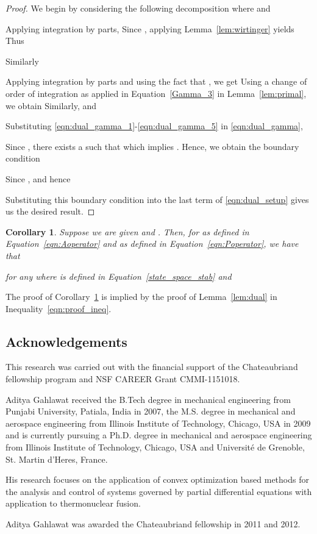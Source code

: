 \documentclass[9pt,journal,twocolumn]{IEEEtran}
\newtheorem{corollary}{Corollary}
\begin{document}
\begin{proof}
We begin by considering the following decomposition
 where
 and


Applying integration by parts,
 Since , applying Lemma~\ref{lem:wirtinger} yields
 Thus


Similarly


Applying integration by parts and using the fact that , we get
 Using a change of order of integration as applied in Equation~\eqref{Gamma_3} in Lemma~\ref{lem:primal}, we obtain
 Similarly,
 and


Substituting \eqref{eqn:dual_gamma_1}-\eqref{eqn:dual_gamma_5} in \eqref{eqn:dual_gamma},


Since , there exists a  such that  which implies . Hence, we obtain the boundary condition

Since ,  and hence

Substituting this boundary condition into the last term of \eqref{eqn:dual_setup} gives us the desired result.
\end{proof}


\begin{corollary}\label{cor:dual2}
Suppose we are given   and . Then, for  as defined in Equation~\eqref{eqn:Aoperator} and  as defined in Equation~\eqref{eqn:Poperator}, we have that

for any  where  is defined in Equation~\eqref{state_space_stab} and

\end{corollary}
The proof of Corollary~\ref{cor:dual2} is implied by the proof of Lemma~\ref{lem:dual} in Inequality~\eqref{eqn:proof_ineq}.


\subsection{Acknowledgements}

 This research was carried out with the financial support of the Chateaubriand fellowship program and NSF CAREER Grant CMMI-1151018.
 


\begin{IEEEbiographynophoto}{Aditya Gahlawat}
received the B.Tech degree in mechanical engineering from Punjabi University, Patiala, India in 2007, the M.S. degree in mechanical and aerospace engineering from Illinois Institute of Technology, Chicago, USA in 2009 and is currently pursuing a Ph.D. degree in mechanical and aerospace engineering from Illinois Institute of Technology, Chicago, USA and Universit\'{e} de Grenoble, St. Martin d'Heres, France. 

His research focuses on the application of convex optimization based methods for the analysis and control of systems governed by partial differential equations with application to thermonuclear fusion.

Aditya Gahlawat was awarded the Chateaubriand fellowship in 2011 and 2012.
\end{IEEEbiographynophoto}
\end{document}
